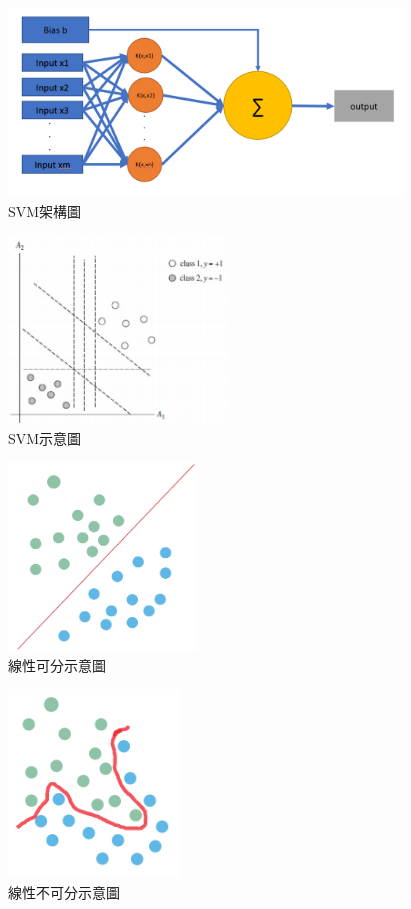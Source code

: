 \begin{figure}[H]
	\centerline{\includegraphics[height=5cm]{pic/SVM ar.PNG}}
	\caption{SVM架構圖}
	\label{fig:SVMArchitecture}
\end{figure}
\begin{figure}[H]
	\centerline{\includegraphics[height=5cm]{pic/SVML.png}}
	\caption{SVM示意圖}
	\label{fig:SVM}
\end{figure}
\begin{figure}[H]
	\centerline{\includegraphics[height=5cm]{pic/linear.PNG}}
	\caption{線性可分示意圖}
	\label{fig:LinearSeparable}
\end{figure}
\begin{figure}[H]
	\centerline{\includegraphics[height=5cm]{pic/unlinear.PNG}}
	\caption{線性不可分示意圖}
	\label{fig:LinearUnseparable}
\end{figure}

